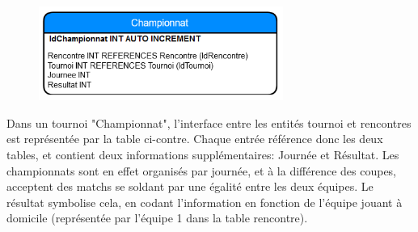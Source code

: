 \documentclass[12pt]{report}
\begin{document}
        \begin{figure}
			\includegraphics[width=8cm]{figures/bdd-rapport-2.png}
		\end{figure}	    
	    
	    \par
	    Dans un tournoi "Championnat", l'interface entre les entités tournoi et rencontres est représentée par la table ci-contre. Chaque entrée référence donc les deux tables, et contient deux informations supplémentaires: Journée et Résultat. Les championnats sont en effet organisés par journée, et à la différence des coupes, acceptent des matchs se soldant par une égalité entre les deux équipes. Le résultat symbolise cela, en codant l'information en fonction de l'équipe jouant à domicile (représentée par l'équipe 1 dans la table rencontre). 
	    \bigskip
	    
\end{document}
